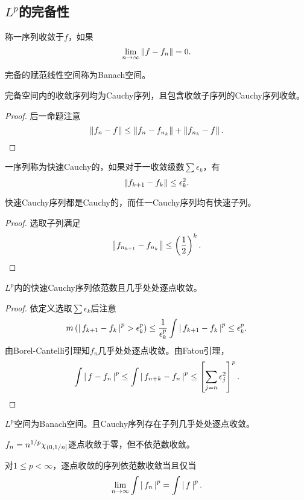 \documentclass{ctexrep}
\begin{document}
  \subsection{$L^p$的完备性}
  \begin{definition}
    称一序列收敛于$f$，如果
    \[ \lim_{n\to\infty}\left\| f-f_n \right\|=0. \]
  \end{definition}
  \begin{definition}
    完备的赋范线性空间称为Banach空间。
  \end{definition}
  \begin{proposition}
    完备空间内的收敛序列均为Cauchy序列，且包含收敛子序列的Cauchy序列收敛。
  \end{proposition}
  \begin{proof}
    后一命题注意
    \[ \left\| f_n-f \right\| \le \left\| f_n-f_{n_k} \right\| + \left\| f_{n_k}-f \right\|. \qedhere  \]
  \end{proof}
  \begin{definition}
    一序列称为快速Cauchy的，如果对于一收敛级数$\sum\epsilon_k$，有
    \[ \left\| f_{k+1}-f_k \right\| \le \epsilon_k^2. \]
  \end{definition}
  \begin{proposition}
    快速Cauchy序列都是Cauchy的，而任一Cauchy序列均有快速子列。
  \end{proposition}
  \begin{proof}
    选取子列满足
    \[ \left\| f_{n_{k+1}}-f_{n_k} \right\| \le \left(\frac{1}{2}\right)^k. \qedhere \]
  \end{proof}
  \begin{theorem}
    $L^p$内的快速Cauchy序列依范数且几乎处处逐点收敛。
  \end{theorem}
  \begin{proof}
    依定义选取$\sum\epsilon_k$后注意
    \[ m\left(\left|\, f_{k+1}-f_k \,\right|^p>\epsilon_k^p\right) \le \frac{1}{\epsilon_k^p}\int\left|\, f_{k+1}-f_k \,\right|^p \le \epsilon_k^p. \]
    由Borel-Cantelli引理知$f_n$几乎处处逐点收敛。由Fatou引理，
    \[ \int\left|\, f-f_n \,\right|^p \le \int\left|\, f_{n+k}-f_n \,\right|^p \le \left[\sum_{j=n} \epsilon_j^2\right]^p. \qedhere \]
  \end{proof}
  \begin{theorem}
    $L^p$空间为Banach空间。且Cauchy序列存在子列几乎处处逐点收敛。
  \end{theorem}
  \begin{ex}
    $f_n=n^{1/p}\chi_{\left(0,1/n\right]}$逐点收敛于零，但不依范数收敛。
  \end{ex}
  \begin{theorem}
    对$1\le p<\infty$，逐点收敛的序列依范数收敛当且仅当
    \[ \lim_{n\to\infty}\int\left|\, f_n \,\right|^p=\int\left|\, f \,\right|^p. \]
  \end{theorem}
\end{document}
